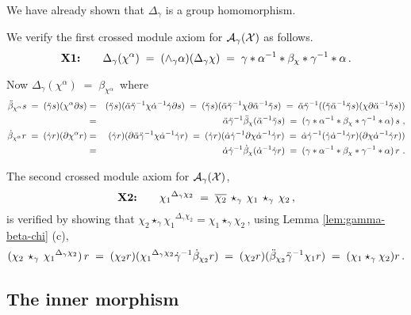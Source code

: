 \begin{pf}
We have already shown that  $\Delta_{\gamma}$  is a group homomorphism.

\medskip\noindent
We verify the first crossed module axiom for  
$\mathcal{A}_{\gamma}(\mathcal{X})$  as follows. 
$$
\mbox{\textbf{X1:}} \quad\quad
\Delta_{\gamma}(\chi^{\alpha}) 
 \;=\;  (\wedge_{\gamma} \alpha)(\Delta_{\gamma}\chi) 
 \;=\;  \gamma*\alpha^{-1}*\beta_{\chi}*\gamma^{-1}*\alpha\,.
$$

\noindent
Now $\Delta_{\gamma}(\chi^{\alpha}) \;=\; \beta_{\chi^{\alpha}}\,$ where 
\begin{eqnarray*} 
\ddot{\beta}_{\chi^{\alpha}} s \;=\; (\ddot{\gamma} s)(\chi^{\alpha} \partial s)
  & = & 
    (\ddot{\gamma} s)(\ddot{\alpha}\ddot{\gamma}^{-1}\chi\dot{\alpha}^{-1}\dot{\gamma}\partial s)
  \;=\;
    (\ddot{\gamma} s)(\ddot{\alpha}\ddot{\gamma}^{-1}\chi\partial\ddot{\alpha}^{-1}\ddot{\gamma} s)
  \;=\;
    \ddot{\alpha}\ddot{\gamma}^{-1}((\ddot{\gamma}\ddot{\alpha}^{-1}\ddot{\gamma} s)(\chi\partial\ddot{\alpha}^{-1}\ddot{\gamma} s)) \\
  & = &
    \ddot{\alpha}\ddot{\gamma}^{-1}\ddot{\beta}_{\chi}(\ddot{\alpha}^{-1}\ddot{\gamma} s)
  \;=\;
    (\gamma * \alpha^{-1} * \beta_{\chi} * \gamma^{-1} * \alpha) \, s ~, \\
\dot{\beta}_{\chi^{\alpha}} r \;=\; (\dot{\gamma} r)(\partial \chi^{\alpha} r)
  & = &
    (\dot{\gamma} r)(\partial \ddot{\alpha} \ddot{\gamma}^{-1} \chi \dot{\alpha}^{-1} \dot{\gamma} r)
  \;=\;
    (\dot{\gamma} r)(\dot{\alpha} \dot{\gamma}^{-1} \partial \chi \dot{\alpha}^{-1} \dot{\gamma} r)
  \;=\;
    \dot{\alpha} \dot{\gamma}^{-1} (\dot{\gamma} \dot{\alpha}^{-1} \dot{\gamma} r) (\partial \chi \dot{\alpha}^{-1} \dot{\gamma} r) ) \\
  & = &
    \dot{\alpha} \dot{\gamma}^{-1} \dot{\beta}_{\chi}(\dot{\alpha}^{-1} \dot{\gamma} r)
  \;=\;
    (\gamma * \alpha^{-1} * \beta_{\chi} * \gamma^{-1} * \alpha) \, r ~. 
\end{eqnarray*}

\noindent
The second crossed module axiom for  $\mathcal{A}_{\gamma}(\mathcal{X})$, 
$$
\mbox{\textbf{X2:}} \quad\quad
{\chi_1}^{\Delta_{\gamma} \chi_2} \;=\;
  \overline{\chi_2} \,\star_{\gamma}\, \chi_1 \,\star_{\gamma}\, \chi_2\,,
$$
is verified by showing that 
$\chi_2 \star_{\gamma} {\chi_1}^{\Delta_{\gamma}\chi_2} 
 = \chi_1 \star_{\gamma} \chi_2$\,, 
using Lemma \ref{lem:gamma-beta-chi} (c), 
$$
(\chi_2 \,\star_{\gamma}\,{\chi_1}^{\Delta_{\gamma} \chi_2})\,r 
  \;=\; (\chi_2 r)({\chi_1}^{\Delta_{\gamma}\chi_2}\dot{\gamma}^{-1}\dot{\beta}_{\chi_2}r)
  \;=\; (\chi_2 r)(\ddot{\beta}_{\chi_2} \ddot{\gamma}^{-1} \chi_1 r)
  \;=\; (\chi_1 \star_{\gamma} \chi_2)r\,. 
$$ 
\end{pf}



\subsection{The inner morphism}
\label{subs:inner-morphism}

